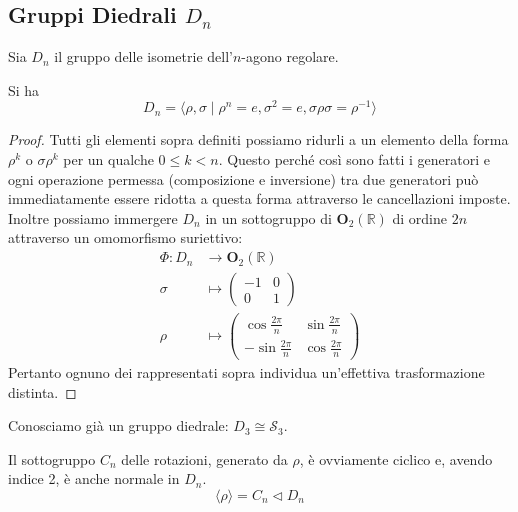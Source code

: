 \subsection{Gruppi Diedrali  $ D_n $}
\begin{multicols}{2}
\begin{definition}
	Sia $ D_n $ il gruppo delle isometrie dell'$ n $-agono regolare.
\end{definition}
\begin{theorem}[Caratterizzazione di $ D_n $]
	Si ha \[ D_n = \langle \rho, \sigma \mid \rho ^n = e, \sigma^2 = e, \sigma \rho \sigma = \rho^{-1} \rangle \]
\end{theorem}
\begin{proof}
	Tutti gli elementi sopra definiti possiamo ridurli a un elemento della forma $ \rho^k $ o $ \sigma \rho^k $ per un qualche $ 0 \leq k < n $. Questo perché così sono fatti i generatori e ogni operazione permessa (composizione e inversione) tra due generatori può immediatamente essere ridotta a questa forma attraverso le cancellazioni imposte. Inoltre possiamo immergere $ D_n $ in un sottogruppo di $ \mathbf{O}_2(\mathbb{R}) $ di ordine $ 2n $ attraverso un omomorfismo suriettivo: \begin{align*}
	\Phi \colon D_n &\to \mathbf{O}_2(\mathbb{R}) \\
	\sigma &\mapsto \left(\begin{matrix}
	-1 & 0 \\
	0 & 1
	\end{matrix}\right) \\
	\rho &\mapsto \left(\begin{matrix}
	\cos\frac{2\pi}{n} & \sin\frac{2\pi}{n} \\
	-\sin\frac{2\pi}{n} & \cos\frac{2\pi}{n}
	\end{matrix}\right) 
	\end{align*}
	Pertanto ognuno dei rappresentati sopra individua un'effettiva trasformazione distinta.
\end{proof}

\begin{remark}
	Conosciamo già un gruppo diedrale: $ D_3 \cong \mathcal{S}_3 $.
\end{remark}
\begin{remark}
	Il sottogruppo $ C_n $ delle rotazioni, generato da $ \rho $, è ovviamente ciclico e, avendo indice 2, è anche normale in $ D_n $. $$ \langle \rho \rangle = C_n \lhd D_n $$
\end{remark}


\end{multicols}
